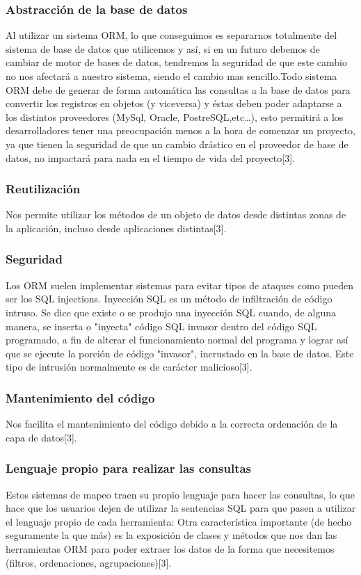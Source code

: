 \documentclass[twoside,twocolumn]{article}
\begin{document}
\subsubsection{Abstracción de la base de datos}
Al utilizar un sistema ORM, lo que conseguimos es separarnos totalmente del sistema de base de datos que utilicemos y así, si en un futuro debemos de cambiar de motor de bases de datos, tendremos la seguridad de que este cambio no nos afectará a nuestro sistema, siendo el cambio mas sencillo.Todo sistema ORM debe de generar de forma automática las consultas a la base de datos para convertir los registros en objetos (y viceversa) y éstas deben poder adaptarse a los distintos proveedores (MySql, Oracle, PostreSQL,etc…), esto permitirá a los desarrolladores tener una preocupación menos a la hora de comenzar un proyecto, ya que tienen la seguridad de que un cambio drástico en el proveedor de base de datos, no impactará para nada en el tiempo de vida del proyecto[3].
\subsubsection{Reutilización}
Nos permite utilizar los métodos de un objeto de datos desde distintas zonas de la aplicación, incluso desde aplicaciones distintas[3].
\subsubsection{Seguridad}
Los ORM suelen implementar sistemas para evitar tipos de ataques como pueden ser los SQL injections. Inyección SQL es un método de infiltración de código intruso. Se dice que existe o se produjo una inyección SQL cuando, de alguna manera, se inserta o "inyecta" código SQL invasor dentro del código SQL programado, a fin de alterar el funcionamiento normal del programa y lograr así que se ejecute la porción de código "invasor", incrustado en la base de datos. Este tipo de intrusión normalmente es de carácter malicioso[3].
\subsubsection{Mantenimiento del código}
Nos facilita el mantenimiento del código debido a la correcta ordenación de la capa de datos[3].
\subsubsection{Lenguaje propio para realizar las consultas}
Estos sistemas de mapeo traen su propio lenguaje para hacer las consultas, lo que hace que los usuarios dejen de utilizar la sentencias
SQL para que pasen a utilizar el lenguaje propio de cada herramienta: Otra característica importante (de hecho seguramente la que más) es la exposición de clases y métodos que nos dan las herramientas ORM para poder extraer los datos de la forma que necesitemos
(filtros, ordenaciones, agrupaciones)[3].
\\
\\
\\
\\
\end{document}
